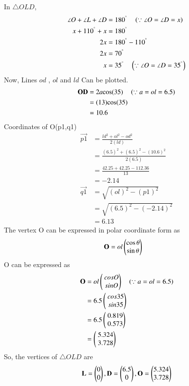 \documentclass[journal,12pt,twocolumn]{IEEEtran}
\begin{document}
In $\triangle OLD$,
\begin{align}
\angle O+\angle L+\angle D&=180^{\degree}
\quad\left(\because \angle O=\angle D=x\right)
\\
\ x+110^{\degree}+x&=180^{\degree}
\\
\ 2x &=180^{\degree}-110^{\degree}
\\
\ 2x &=70^{\degree}
\\
\ x &=35^{\degree} \quad\left(\because \angle O=\angle D=35^{\degree}\right)
\end{align}
Now, Lines $od$ , $ol$ and $ld$ Can be plotted.
\
\begin{align}
\mathbf{OD}&=2{a}{\cos(35)} \quad\left(\because a=ol=6.5\right)
\\
&=(13){\cos(35)}
\\
&=10.6
\end{align}
Coordinates of O(p1,q1)
\begin{align}
\vec{p1}&=\frac{ld^2+ol^2-od^2}{2(ld)}
\\
&=\frac{(6.5)^2+(6.5)^2-(10.6)^2}{2(6.5)}
\\
&=\frac{42.25+42.25-112.36}{13}
\\
&=-2.14
\\
\vec{q1}&=\sqrt{(ol)^2-(p1)^2}
\\
&=\sqrt{(6.5)^2-(-2.14)^2}
\\
&=6.13
\end{align}
The vertex O can be expressed in polar coordinate form as 
\begin {align}
\mathbf{O} &= ol\begin{pmatrix}\cos \theta\\ \sin \theta\end{pmatrix}
\end{align}
O can be expressed as 
\begin{align}
\mathbf{O} &= ol\begin{pmatrix}\ cos O \\ \ sin O\end{pmatrix} \quad\left(\because a=ol=6.5\right)
\\
&= 6.5\begin{pmatrix}\ cos 35 \\ \ sin 35\end{pmatrix}
\\
&= 6.5\begin{pmatrix}\ 0.819 \\ \ 0.573\end{pmatrix}
\\
&= \begin{pmatrix}\ 5.324 \\ \ 3.728\end{pmatrix}
\end{align}
So, the vertices of $\triangle OLD$ are
\begin{align}
\mathbf{L}=\begin{pmatrix}0\\0\end{pmatrix},
\mathbf{D}=\begin{pmatrix}6.5\\0\end{pmatrix}, 
\mathbf{O}=\begin{pmatrix}5.324\\3.728\end{pmatrix}
\end{align}
\end{document}
